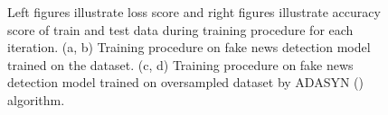 \begin{figure}%
	\centering
	\qquad
	\qquad
	\qquad
	\caption{Left figures illustrate loss score and right figures illustrate accuracy score of train and test data during training procedure for each iteration. 
		(a, b) Training procedure on fake news detection model trained on the \cite{stance_persian} dataset.
		(c, d) Training procedure on fake news detection model trained on oversampled \cite{stance_persian} dataset by ADASYN (\cite{adasyn}) algorithm.}%
	\label{fig:fakenews}%
\end{figure}